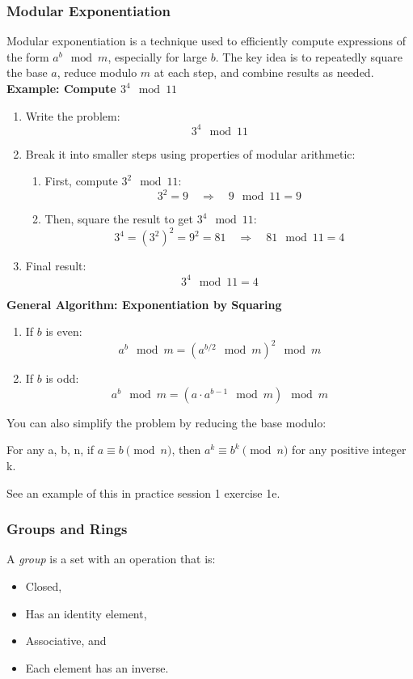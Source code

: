 \subsubsection{Modular Exponentiation}
Modular exponentiation is a technique used to efficiently compute expressions of the form \( a^b \mod m \), especially for large \( b \). The key idea is to repeatedly square the base \( a \), reduce modulo \( m \) at each step, and combine results as needed. \\

\textbf{Example: Compute \( 3^4 \mod 11 \)}

\begin{enumerate}
    \item Write the problem:
    \[
    3^4 \mod 11
    \]
 
 \item Break it into smaller steps using properties of modular arithmetic:
 \begin{enumerate}
    \item First, compute \( 3^2 \mod 11 \):
    \[
    3^2 = 9 \quad \Rightarrow \quad 9 \mod 11 = 9
    \]
    \item Then, square the result to get \( 3^4 \mod 11 \):
    \[
    3^4 = (3^2)^2 = 9^2 = 81 \quad \Rightarrow \quad 81 \mod 11 = 4
    \]
 \end{enumerate}
 
 \item Final result:
    \[
    3^4 \mod 11 = 4
    \]
 
\end{enumerate}
 
\textbf{General Algorithm: Exponentiation by Squaring}
\begin{enumerate}
    \item If \( b \) is even:
    \[
    a^b \mod m = \left( a^{b/2} \mod m \right)^2 \mod m
    \]
    \item If \( b \) is odd:
    \[
    a^b \mod m = \left( a \cdot a^{b-1} \mod m \right) \mod m
    \]
\end{enumerate}

You can also simplify the problem by reducing the base modulo:
\begin{defn}
    For any a, b, n, if $a \equiv b \pmod{n}$, then $a^k \equiv b^k \pmod{n}$ for any positive integer k.
\end{defn}
See an example of this in practice session 1 exercise 1e. 

\subsubsection{Groups and Rings}
\begin{defn}
    A \emph{group} is a set with an operation that is:
    \begin{itemize}
        \item Closed,
        \item Has an identity element,
        \item Associative, and
        \item Each element has an inverse.
    \end{itemize}
    \end{defn}
    
